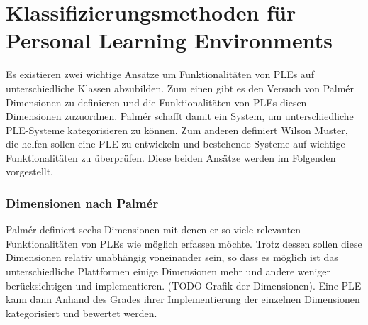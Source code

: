 \section{Klassifizierungsmethoden für Personal Learning Environments}\label{section:klassifizierungsmethoden}
Es existieren zwei wichtige Ansätze um Funktionalitäten von PLEs auf unterschiedliche Klassen abzubilden. Zum einen gibt es den Versuch von Palmér Dimensionen zu definieren und die Funktionalitäten von PLEs diesen Dimensionen zuzuordnen. Palmér schafft damit ein System, um unterschiedliche PLE-Systeme kategorisieren zu können. Zum anderen definiert Wilson Muster, die helfen sollen eine PLE zu entwickeln und bestehende Systeme auf wichtige Funktionalitäten zu überprüfen. Diese beiden Ansätze werden im Folgenden vorgestellt.

\subsubsection{Dimensionen nach Palmér}\label{section:dimensions_palmer} 
Palmér definiert sechs Dimensionen mit denen er so viele relevanten Funktionalitäten von PLEs wie möglich erfassen möchte\cite{Palmer2009}. Trotz dessen sollen diese Dimensionen relativ unabhängig voneinander sein, so dass es möglich ist das unterschiedliche Plattformen einige Dimensionen mehr und andere weniger berücksichtigen und implementieren. (TODO Grafik der Dimensionen). Eine PLE kann dann Anhand des Grades ihrer Implementierung der einzelnen Dimensionen kategorisiert und bewertet werden.

